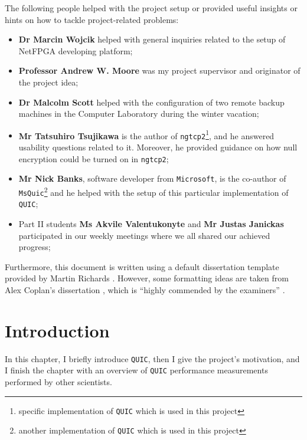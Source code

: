 \documentclass[12pt,a4paper,twoside,openright]{report}
\begin{document}
The following people helped with the project setup or provided useful insights or hints on how to tackle project-related problems:
\begin{itemize}
    \item \textbf{Dr Marcin Wojcik} helped with general inquiries related to the setup of NetFPGA developing platform;
    \item \textbf{Professor Andrew W. Moore} was my project supervisor and originator of the project idea;
    \item \textbf{Dr Malcolm Scott} helped with the configuration of two remote backup machines in the Computer Laboratory during the winter vacation;
    \item \textbf{Mr Tatsuhiro Tsujikawa} is the author of \texttt{ngtcp2}\footnote{specific implementation of \texttt{QUIC} which is used in this project}, and he answered usability questions related to it. Moreover, he provided guidance on how null encryption could be turned on in \texttt{ngtcp2};
    \item \textbf{Mr Nick Banks}, software developer from \texttt{Microsoft}, is the co-author of \texttt{MsQuic}\footnote{another implementation of \texttt{QUIC} which is used in this project} and he helped with the setup of this particular implementation of \texttt{QUIC};
    \item Part II students \textbf{Ms Akvile Valentukonyte} and \textbf{Mr Justas Janickas} participated in our weekly meetings where we all shared our achieved progress;
\end{itemize}

Furthermore, this document is written using a default dissertation template provided by Martin Richards \cite{how_to_write_a_dissertation_in_LATEX}.
However, some formatting ideas are taken from Alex Coplan's dissertation \cite{Alex_Coplan_dissertation}, which is \enquote{highly commended by the examiners} \cite{Computer_Lab_dissertations}.


\pagestyle{headings}

\chapter{Introduction}
In this chapter, I briefly introduce \texttt{QUIC}, then I give the project's motivation, and I finish the chapter with an overview of \texttt{QUIC} performance measurements performed by other scientists.
\end{document}
